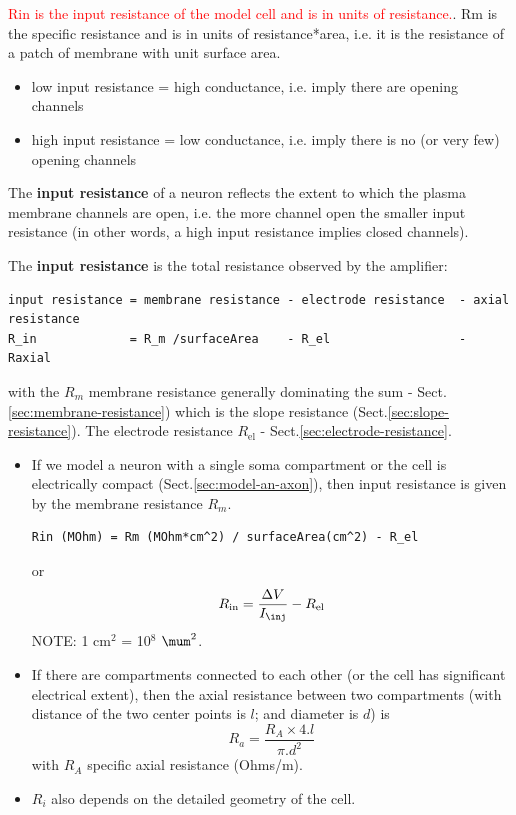 \textcolor{red}{Rin is the input resistance of the model cell and is in units of
resistance.}.  Rm is the specific resistance and is in units of resistance*area,
i.e. it is the resistance of a patch of membrane with unit surface area.

\begin{itemize}
  \item low input resistance = high conductance, i.e. imply there are opening
  channels
  
  \item high input resistance = low conductance, i.e. imply there is no (or
  very few) opening channels
\end{itemize}
The {\bf input resistance} of a neuron reflects the extent to which the plasma
membrane channels are open, i.e. the more channel open the smaller input
resistance (in other words, a high input resistance implies closed channels).


The {\bf input resistance} is the total resistance observed
by the amplifier: 
\begin{verbatim}
input resistance = membrane resistance - electrode resistance  - axial resistance
R_in             = R_m /surfaceArea    - R_el                  - Raxial
\end{verbatim}
with the $R_m$ membrane resistance generally dominating the sum -
Sect.\ref{sec:membrane-resistance}) which is the slope resistance
(Sect.\ref{sec:slope-resistance}). The electrode resistance $R_\text{el}$ -
Sect.\ref{sec:electrode-resistance}.

\begin{itemize}
  
  \item If we model a neuron with a single soma compartment
or the cell is electrically compact (Sect.\ref{sec:model-an-axon}), then input
resistance is given by the membrane resistance $R_m$.

\begin{verbatim}
Rin (MOhm) = Rm (MOhm*cm^2) / surfaceArea(cm^2) - R_el
\end{verbatim}
or 
\begin{equation}
R_\text{in} = \frac{\Delta V}{I_\inj} - R_\text{el}
\end{equation}
NOTE: 1 cm$^2$ = 10$^8$ $\mum^2$. 

  \item If there are compartments connected to each other (or the cell has
  significant electrical extent), then the axial resistance between two
  compartments (with distance of the two center points is $l$; and diameter is
  $d$) is
\begin{equation}
R_a = \frac{R_A \times 4. l}{\pi .d^2}
\end{equation}
with $R_A$ specific axial resistance (Ohms/m).

  \item $R_i$ also depends on the detailed geometry of the cell.
\end{itemize}


